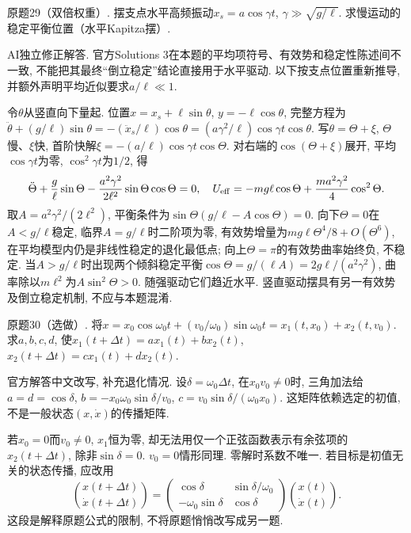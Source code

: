 \begin{exercise}
原题29（双倍权重）. 摆支点水平高频振动$x_s=a\cos\gamma t$, $\gamma\gg\sqrt{g/\ell}$. 求慢运动的稳定平衡位置（水平Kapitza摆）.
\end{exercise}
\begin{solution}
AI独立修正解答. 官方Solutions 3在本题的平均项符号、有效势和稳定性陈述间不一致, 不能把其最终“倒立稳定”结论直接用于水平驱动. 以下按支点位置重新推导, 并额外声明平均近似要求$a/\ell\ll1$.

令$\theta$从竖直向下量起. 位置$x=x_s+\ell\sin\theta$, $y=-\ell\cos\theta$, 完整方程为$\ddot\theta+(g/\ell)\sin\theta=-(\ddot x_s/\ell)\cos\theta=(a\gamma^2/\ell)\cos\gamma t\cos\theta$. 写$\theta=\Theta+\xi$, $\Theta$慢、$\xi$快, 首阶快解$\xi=-(a/\ell)\cos\gamma t\cos\Theta$. 对右端的$\cos(\Theta+\xi)$展开, 平均$\cos\gamma t$为零, $\cos^2\gamma t$为$1/2$, 得
\[
\ddot\Theta+\frac g\ell\sin\Theta
-\frac{a^2\gamma^2}{2\ell^2}\sin\Theta\cos\Theta=0,
\quad
U_{\rm eff}=-mg\ell\cos\Theta+\frac{ma^2\gamma^2}{4}\cos^2\Theta.
\]
取$A=a^2\gamma^2/(2\ell^2)$, 平衡条件为$\sin\Theta(g/\ell-A\cos\Theta)=0$. 向下$\Theta=0$在$A<g/\ell$稳定, 临界$A=g/\ell$时二阶项为零, 有效势增量为$mg\ell\Theta^4/8+O(\Theta^6)$, 在平均模型内仍是非线性稳定的退化最低点; 向上$\Theta=\pi$的有效势曲率始终负, 不稳定. 当$A>g/\ell$时出现两个倾斜稳定平衡$\cos\Theta=g/(\ell A)=2g\ell/(a^2\gamma^2)$, 曲率除以$m\ell^2$为$A\sin^2\Theta>0$. 随强驱动它们趋近水平. 竖直驱动摆具有另一有效势及倒立稳定机制, 不应与本题混淆.
\end{solution}

\begin{exercise}
原题30（选做）. 将$x=x_0\cos\omega_0t+(v_0/\omega_0)\sin\omega_0t=x_1(t,x_0)+x_2(t,v_0)$. 求$a,b,c,d$, 使$x_1(t+\Delta t)=ax_1(t)+bx_2(t)$, $x_2(t+\Delta t)=cx_1(t)+dx_2(t)$.
\end{exercise}
\begin{solution}
官方解答中文改写, 补充退化情况. 设$\delta=\omega_0\Delta t$, 在$x_0v_0\ne0$时, 三角加法给$a=d=\cos\delta$, $b=-x_0\omega_0\sin\delta/v_0$, $c=v_0\sin\delta/(\omega_0x_0)$. 这矩阵依赖选定的初值, 不是一般状态$(x,\dot x)$的传播矩阵.

若$x_0=0$而$v_0\ne0$, $x_1$恒为零, 却无法用仅一个正弦函数表示有余弦项的$x_2(t+\Delta t)$, 除非$\sin\delta=0$. $v_0=0$情形同理. 零解时系数不唯一. 若目标是初值无关的状态传播, 应改用
\[
\binom{x(t+\Delta t)}{\dot x(t+\Delta t)}
=\begin{pmatrix}\cos\delta&\sin\delta/\omega_0\\-\omega_0\sin\delta&\cos\delta\end{pmatrix}
\binom{x(t)}{\dot x(t)}.
\]
这段是解释原题公式的限制, 不将原题悄悄改写成另一题.
\end{solution}

